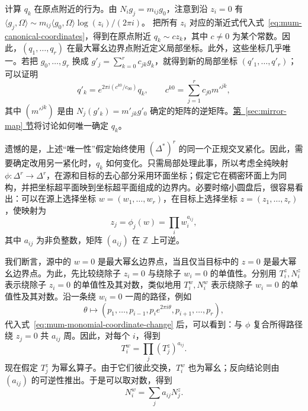 计算 $q_k$ 在原点附近的行为。由 $N_i g_j=m_{ij}g_0$，注意到沿 $z_i=0$ 有
$\langle g_j,\Omega\rangle\sim m_{ij}\langle g_0,\Omega\rangle\log(z_i)/(2\pi i)$。
把所有 $z_i$ 对应的渐近式代入式~\eqref{eq:mum-canonical-coordinates}，得到在原点附近 $q_k\sim cz_k$，其中 $c\ne0$ 为某个常数。因此，$(q_1,\ldots,q_r)$ 在最大幂幺边界点附近定义局部坐标。此外，这些坐标几乎唯一。若把 $g_0,\ldots,g_r$ 换成 $g'_j=\sum_{k=0}^r c_{jk}g_k$，就得到新的局部坐标 $(q'_1,\ldots,q'_r)$；可以证明
\begin{equation}\label{eq:mum-coordinate-basis-change}
q'_k=e^{2\pi i(c^{k0}/c_{00})}q_k,\qquad
c^{k0}=\sum_{j=1}^r c_{j0}m'^{jk},
\end{equation}
其中 $(m'^{jk})$ 是由 $N_j(g'_k)=m'_{jk}g'_0$ 确定的矩阵的逆矩阵。\hyperref[sec:mirror-map]{第~\ref*{sec:mirror-map} 节}将讨论如何唯一确定 $q_k$。

遗憾的是，上述“唯一性”假定始终使用 $(\Delta^*)^r$ 的同一个正规交叉紧化。因此，需要确定改用另一紧化时，$q_k$ 如何变化。只需局部处理此事，所以考虑全纯映射 $\phi:\Delta^r\to\Delta^r$，在源和目标的去心部分采用环面坐标；假定它在稠密环面上为同构，并把坐标超平面映到坐标超平面组成的边界内。必要时缩小圆盘后，很容易看出：可以在源上选择坐标 $w=(w_1,\ldots,w_r)$，在目标上选择坐标 $z=(z_1,\ldots,z_r)$，使映射为
\begin{equation}\label{eq:mum-monomial-coordinate-change}
z_j=\phi_j(w)=\prod_i w_i^{a_{ij}},
\end{equation}
其中 $a_{ij}$ 为非负整数，矩阵 $(a_{ij})$ 在 $\mathbb Z$ 上可逆。

我们断言，源中的 $w=0$ 是最大幂幺边界点，当且仅当目标中的 $z=0$ 是最大幂幺边界点。为此，先比较绕除子 $z_i=0$ 与绕除子 $w_i=0$ 的单值性。分别用 $T_i^z,N_i^z$ 表示绕除子 $z_i=0$ 的单值性及其对数，类似地用 $T_i^w,N_i^w$ 表示绕除子 $w_i=0$ 的单值性及其对数。沿一条绕 $w_i=0$ 一周的路径，例如
\[
\theta\longmapsto(p_1,\ldots,p_{i-1},p_i e^{2\pi i\theta},p_{i+1},\ldots,p_r),
\]
代入式~\eqref{eq:mum-monomial-coordinate-change} 后，可以看到：与 $\phi$ 复合所得路径绕 $z_j=0$ 共 $a_{ij}$ 周。因此，对每个 $i$，得到
\[
T_i^w=\prod_j(T_j^z)^{a_{ij}}.
\]
现在假定 $T_j^z$ 为幂幺算子。由于它们彼此交换，$T_i^w$ 也为幂幺；反向结论则由 $(a_{ij})$ 的可逆性推出。于是可以取对数，得到
\begin{equation}\label{eq:mum-log-coordinate-change}
N_i^w=\sum_j a_{ij}N_j^z.
\end{equation}

